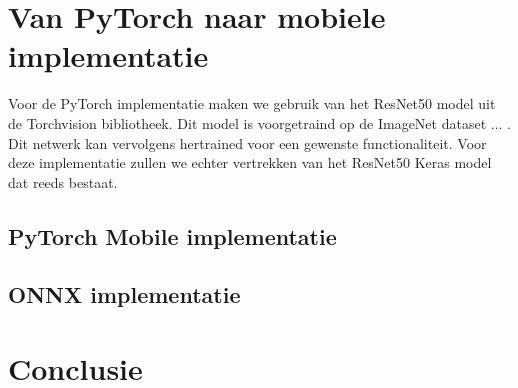 \section{Van PyTorch naar mobiele implementatie}
Voor de PyTorch implementatie maken we gebruik van het ResNet50 model uit de Torchvision bibliotheek.
Dit model is voorgetraind op de ImageNet dataset ... .
Dit netwerk kan vervolgens hertrained voor een gewenste functionaliteit.
Voor deze implementatie zullen we echter vertrekken van het ResNet50 Keras model dat reeds bestaat.

\subsection{PyTorch Mobile implementatie}


\subsection{ONNX implementatie}

\section{Conclusie}